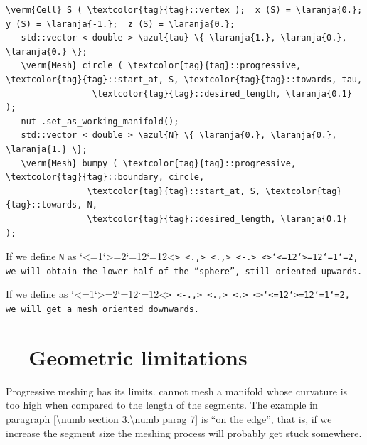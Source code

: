 \begin{Verbatim}[commandchars=\\\{\},formatcom=\small\tt,frame=single,
   label=parag-\ref{\numb section 3.\numb parag 15}.cpp,rulecolor=\color{coment},
   baselinestretch=0.94,framesep=2mm                                            ]
   \verm{Cell} S ( \textcolor{tag}{tag}::vertex );  x (S) = \laranja{0.};  y (S) = \laranja{-1.};  z (S) = \laranja{0.};
   std::vector < double > \azul{tau} \{ \laranja{1.}, \laranja{0.}, \laranja{0.} \};
   \verm{Mesh} circle ( \textcolor{tag}{tag}::progressive, \textcolor{tag}{tag}::start_at, S, \textcolor{tag}{tag}::towards, tau,
                 \textcolor{tag}{tag}::desired_length, \laranja{0.1}                              );
   nut .set_as_working_manifold();
   std::vector < double > \azul{N} \{ \laranja{0.}, \laranja{0.}, \laranja{1.} \};
   \verm{Mesh} bumpy ( \textcolor{tag}{tag}::progressive, \textcolor{tag}{tag}::boundary, circle,
                \textcolor{tag}{tag}::start_at, S, \textcolor{tag}{tag}::towards, N,
                \textcolor{tag}{tag}::desired_length, \laranja{0.1}                );
\end{Verbatim}

If we define {\small\tt\azul N} as \catcode`<=1\catcode`>=2\catcode`{=12\catcode`}=12<\small\tt {>
<\small\tt{}\laranja.,> <\small\tt{}\laranja.,>
<\small\tt \laranja-\laranja.> <\small\tt }>\catcode`<=12\catcode`>=12\catcode`{=1\catcode`}=2, we will obtain
the lower half of the ``sphere'', still oriented upwards.

If we define {\small\tt{}} as \catcode`<=1\catcode`>=2\catcode`{=12\catcode`}=12<\small\tt {>
<\small\tt\laranja-\laranja.,> <\small\tt{}\laranja.,> <\small\tt{}\laranja.> <\small\tt }>\catcode`<=12\catcode`>=12\catcode`{=1\catcode`}=2, we will get a mesh
oriented downwards.


\section{~~Geometric limitations}\label{\numb section 3.\numb parag 16}

Progressive meshing has its limits.
{\ManiFEM} cannot mesh a manifold whose curvature is too high when compared to the
length of the segments.
The example in paragraph \ref{\numb section 3.\numb parag 7} is ``on the edge'', that is,
if we increase the segment size the meshing process will probably get stuck somewhere.

